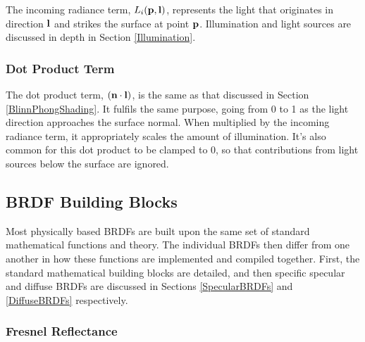 The incoming radiance term, \begin{math}L_i(\mathbf{p}, \mathbf{l})\end{math}, represents the light that originates in direction \begin{math}\mathbf{l}\end{math} and strikes the surface at point \begin{math}\mathbf{p}\end{math}. Illumination and light sources are discussed in depth in Section \ref{Illumination}.

\subsubsection{Dot Product Term}

The dot product term, \begin{math}(\mathbf{n}\cdot\mathbf{l})\end{math}, is the same as that discussed in Section \ref{BlinnPhongShading}. It fulfils the same purpose, going from 0 to 1 as the light direction approaches the surface normal. When multiplied by the incoming radiance term, it appropriately scales the amount of illumination. It's also common for this dot product to be clamped to 0, so that contributions from light sources below the surface are ignored.

\subsection{BRDF Building Blocks} \label{BRDFBuildingBlocks}

Most physically based BRDFs are built upon the same set of standard mathematical functions and theory. The individual BRDFs then differ from one another in how these functions are implemented and compiled together. First, the standard mathematical building blocks are detailed, and then specific specular and diffuse BRDFs are discussed in Sections \ref{SpecularBRDFs} and \ref{DiffuseBRDFs} respectively.

\subsubsection{Fresnel Reflectance} \label{FresnelReflectance}

